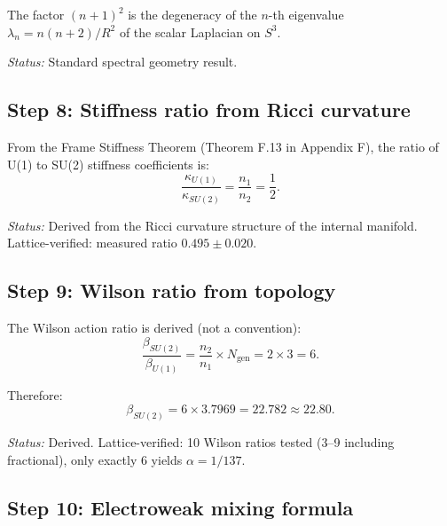 \documentclass[12pt,a4paper]{article}
\begin{document}
The factor $(n+1)^2$ is the degeneracy of the $n$-th eigenvalue
$\lambda_n = n(n+2)/R^2$ of the scalar Laplacian on $S^3$.

\textit{Status:} Standard spectral geometry result.

\subsection{Step 8: Stiffness ratio from Ricci curvature}

From the Frame Stiffness Theorem (Theorem F.13 in Appendix F), the
ratio of U(1) to SU(2) stiffness coefficients is:
\begin{equation}\tag{E8}
\frac{\kappa_{U(1)}}{\kappa_{SU(2)}} = \frac{n_1}{n_2} = \frac{1}{2}.
\end{equation}

\textit{Status:} Derived from the Ricci curvature structure of the
internal manifold.  Lattice-verified: measured ratio $0.495 \pm 0.020$.

\subsection{Step 9: Wilson ratio from topology}

The Wilson action ratio is derived (not a convention):
\begin{equation}\tag{E9a}
\frac{\beta_{SU(2)}}{\beta_{U(1)}} = \frac{n_2}{n_1} \times N_{\mathrm{gen}}
= 2 \times 3 = 6.
\end{equation}

Therefore:
\begin{equation}\tag{E9b}
\beta_{SU(2)} = 6 \times 3.7969 = 22.782 \approx 22.80.
\end{equation}

\textit{Status:} Derived.  Lattice-verified: 10 Wilson ratios tested
(3--9 including fractional), only exactly 6 yields $\alpha = 1/137$.

\subsection{Step 10: Electroweak mixing formula}
\end{document}
